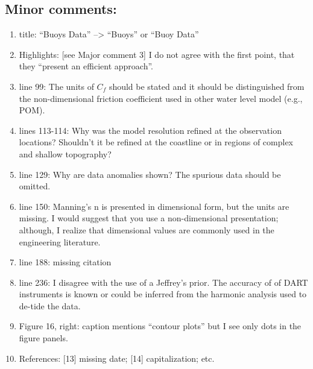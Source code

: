 \documentclass[]{article}
\begin{document}
\subsection*{Minor comments:}
\begin{enumerate}
\item title: ``Buoys Data'' --> ``Buoys'' or ``Buoy Data''
\item Highlights: [see Major comment 3] I do not agree with the first point, that they ``present an efficient approach''.
\item line 99: The units of $C_f$ should be stated and it should be distinguished from the non-dimensional friction coefficient used in other water level model (e.g., POM).
\item lines 113-114: Why was the model resolution refined at the observation locations? Shouldn't it be refined at the coastline or in regions of complex and shallow topography?
\item line 129: Why are data anomalies shown? The spurious data should be omitted.
\item line 150: Manning's n is presented in dimensional form, but the units are missing. I would suggest that you use a non-dimensional presentation; although, I realize that dimensional values are commonly used in the engineering literature.
\item line 188: missing citation
\item line 236: I disagree with the use of a Jeffrey's prior. The accuracy of of DART instruments is known or could be inferred from the harmonic analysis used to de-tide the data.
\item Figure 16, right: caption mentions ``contour plots'' but I see only dots in the figure panels.
\item References: [13] missing date; [14] capitalization; etc.
\end{enumerate}





\end{document}

